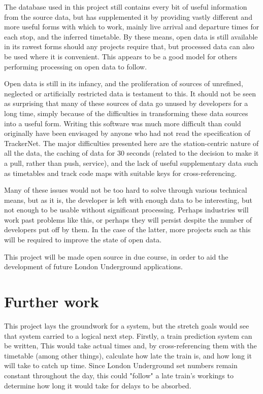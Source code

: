 \documentclass[a4paper,12pt]{report}
\begin{document}
The database used in this project still contains every bit of useful
information from the source data, but has supplemented it by providing vastly
different and more useful forms with which to work, mainly live arrival and
departure times for each stop, and the inferred timetable. By these means, open
data is still available in its rawest forms should any projects require that,
but processed data can also be used where it is convenient. This appears to be
a good model for others performing processing on open data to follow.

Open data is still in its infancy, and the proliferation of sources of
unrefined, neglected or artificially restricted data is testament to this. It
should not be seen as surprising that many of these sources of data go unused
by developers for a long time, simply because of the difficulties in
transforming these data sources into a useful form. Writing this software was
much more difficult than could originally have been envisaged by anyone who had
not read the specification of TrackerNet. The major difficulties presented here
are the station-centric nature of all the data, the caching of data for 30
seconds (related to the decision to make it a pull, rather than push, service),
and the lack of useful supplementary data such as timetables and track code
maps with suitable keys for cross-referencing.

Many of these issues would not be too hard to solve through various technical
means, but as it is, the developer is left with enough data to be interesting,
but not enough to be usable without significant processing. Perhaps industries
will work past problems like this, or perhaps they will persist despite the
number of developers put off by them. In the case of the latter, more projects
such as this will be required to improve the state of open data.

This project will be made open source in due course, in order to aid the
development of future London Underground applications.

\section{Further work}

This project lays the groundwork for a system, but the stretch goals would see
that system carried to a logical next step. Firstly, a train prediction system
can be written, This would take actual times and, by cross-referencing them
with the timetable (among other things), calculate how late the train is, and
how long it will take to catch up time. Since London Underground set numbers
remain constant throughout the day, this could "follow" a late train's workings
to determine how long it would take for delays to be absorbed.
\end{document}
